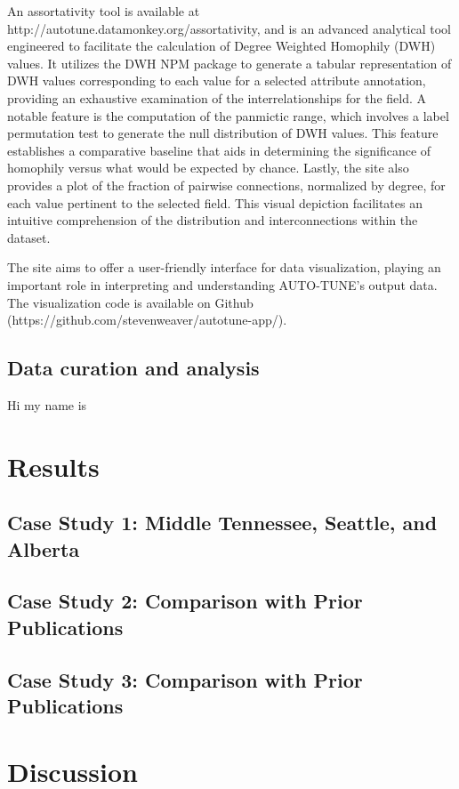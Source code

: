 \documentclass[utf8]{FrontiersinHarvard} %
\begin{document}
An assortativity tool is available at http://autotune.datamonkey.org/assortativity, and is an advanced analytical tool engineered to facilitate the calculation of Degree Weighted Homophily (DWH) values. It utilizes the DWH NPM package to generate a tabular representation of DWH values corresponding to each value for a selected attribute annotation, providing an exhaustive examination of the interrelationships for the field.
A notable feature is the computation of the panmictic range, which involves a label permutation test to generate the null distribution of DWH values. This feature establishes a comparative baseline that aids in determining the significance of homophily versus what would be expected by chance.
Lastly, the site also provides a plot of the fraction of pairwise connections, normalized by degree, for each value pertinent to the selected field. This visual depiction facilitates an intuitive comprehension of the distribution and interconnections within the dataset.

The site aims to offer a user-friendly interface for data visualization, playing an important role in interpreting and understanding AUTO-TUNE's output data. The visualization code is available on Github (https://github.com/stevenweaver/autotune-app/).

\subsection{Data curation and analysis}
Hi my name is
\section{Results}

\subsection{Case Study 1: Middle Tennessee, Seattle, and Alberta}

\subsection{Case Study 2: Comparison with Prior Publications}

\subsection{Case Study 3: Comparison with Prior Publications}


\section{Discussion}
\end{document}

